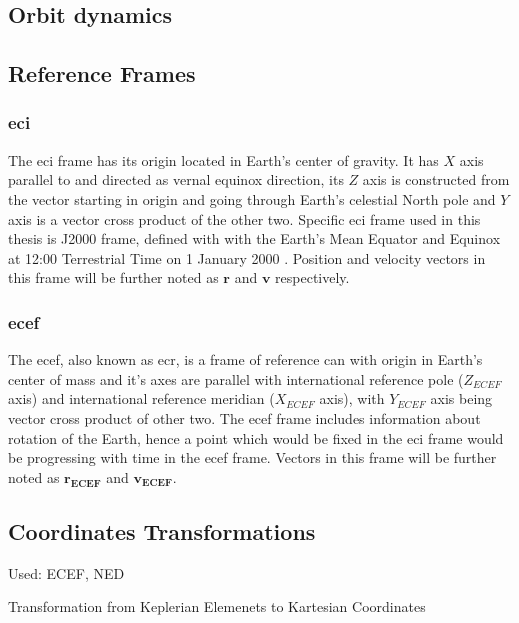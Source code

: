 \subsection{Orbit dynamics}

    \subsection{Reference Frames}
        \subsubsection{\ac*{eci}}
            The \ac{eci} frame has its origin located in Earth's center of gravity. It has $X$ axis parallel to and directed as vernal equinox direction, its $Z$ axis is constructed from the vector starting in origin and going through Earth's celestial North pole and $Y$ axis is a vector cross product of the other two. Specific \ac{eci} frame used in this thesis is J2000 frame, defined with with the Earth's Mean Equator and Equinox at 12:00 Terrestrial Time on 1 January 2000 \cite{schutz2004statistical}. Position and velocity vectors in this frame will be further noted as $\textbf{r}$ and $\textbf{v}$ respectively.

        \subsubsection{\ac*{ecef}}
            The \ac{ecef}, also known as \ac{ecr}, is a frame of reference can with origin in Earth's center of mass and it's axes are parallel with international reference pole ($Z_{ECEF}$ axis) and international reference meridian ($X_{ECEF}$ axis), with $Y_{ECEF}$ axis being vector cross product of other two. The \ac{ecef} frame includes information about rotation of the Earth, hence a point which would be fixed in the \ac{eci} frame would be progressing with time in the \ac{ecef} frame. Vectors in this frame will be further noted as $\textbf{r}_{\textbf{ECEF}}$ and $\textbf{v}_{\textbf{ECEF}} $.


    \subsection{Coordinates Transformations}
        Used: ECEF, NED

        Transformation from Keplerian Elemenets to Kartesian Coordinates

